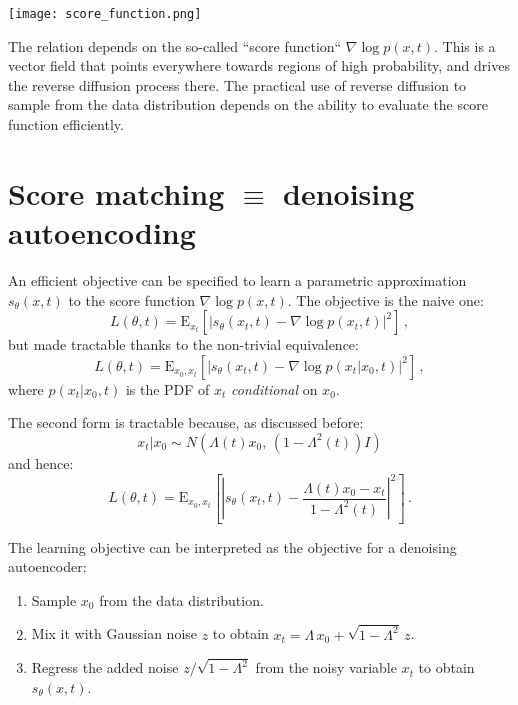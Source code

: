 \documentclass[10pt,letterpaper]{article}
\newcommand{\normal}[2]{N\!\left(#1,\,#2\right)}
\newcommand{\expectation}[2]{\mathrm{E}_{#1}\!\left[#2\right]}
\begin{document}
\begin{center}
    \texttt{[image: score\_function.png]}
\end{center}

The relation depends on the so-called ``score function`` $\nabla \log p(x, t)$.
This is a vector field that points everywhere towards regions of high
probability, and drives the reverse diffusion process there.  The practical use
of reverse diffusion to sample from the data distribution depends on the
ability to evaluate the score function efficiently.

\section{Score matching $\equiv$ denoising autoencoding}

An efficient objective can be specified to learn a parametric approximation
$s_\theta(x, t)$ to the score function $\nabla \log p(x, t)$. The objective is
the naive one:
\begin{equation}
    L(\theta, t) = \expectation{x_t}{\left|s_{\theta}(x_t, t) - \nabla \log p(x_t, t)\right|^2}\,,
\end{equation}
but made tractable thanks to the non-trivial equivalence:
\begin{equation}
    L(\theta, t) = \expectation{x_0, x_t}{\left|s_{\theta}(x_t, t) - \nabla \log p(x_t | x_0, t)\right|^2}\,,
\end{equation}
where $p(x_t|x_0, t)$ is the PDF of $x_t$ \emph{conditional} on $x_0$.

The second form is tractable because, as discussed before:
\begin{equation}
    x_t|x_0 \sim \normal{\Lambda(t) x_0}{(1 - \Lambda^2(t)) I}
\end{equation}
and hence:
\begin{equation}
    L(\theta, t) = \expectation{x_0, x_t}{\left|s_{\theta}(x_t, t) - 
    \frac{\Lambda(t)x_0 - x_t}{1 - \Lambda^2(t)}\right|^2}\,.
\end{equation}

The learning objective can be interpreted as the objective for a denoising
autoencoder:
\begin{enumerate}
    \item Sample $x_0$ from the data distribution.
    \item Mix it with Gaussian noise $z$ to obtain $x_t = \Lambda\, x_0 +
        \sqrt{1 - \Lambda^2}\, z$.
    \item Regress the added noise $z / \sqrt{1 - \Lambda^2}$ from the noisy
        variable $x_t$ to obtain $s_\theta(x, t)$.
\end{enumerate}
\end{document}

